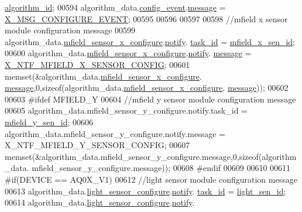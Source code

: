 \begin{DoxyCode}
{{{{{      \hyperlink{a00038_aff3e3d622fcd96787628167d3c1856f9}{algorithm\_id};
00594     algorithm\_data.\hyperlink{a00016_a461881ff0583945fd26ee6d5faf8ce1b}{config\_event}.\hyperlink{a00036_adf9665938515a20c283eea2c978cf80d}{message}                      = 
      \hyperlink{a00016_a410c7d83b819fa283303a53830c87a96}{X\_MSG\_CONFIGURE\_EVENT};
00595 
00596    
00597 
00598     \textcolor{comment}{//mfield x sensor module configuration message}
00599     algorithm\_data.\hyperlink{a00016_a1bfdf4869db9c4f125b763d2e27c6c08}{mfield\_sensor\_x\_configure}.\hyperlink{a00019_a8e6a04c2283f9fd7b8dcbc62faba5847}{notify}.
      \hyperlink{a00036_a21b41e494a28583d4da10f1afb1c5328}{task\_id}  = \hyperlink{a00019_a19a33e680bf19d1aed76750132ed8b64}{mfield\_x\_sen\_id};
00600     algorithm\_data.\hyperlink{a00016_a1bfdf4869db9c4f125b763d2e27c6c08}{mfield\_sensor\_x\_configure}.\hyperlink{a00019_a8e6a04c2283f9fd7b8dcbc62faba5847}{notify}.
      \hyperlink{a00036_adf9665938515a20c283eea2c978cf80d}{message}  = \hyperlink{a00019_aa16cf9dd51c7cbef48581b7862153ced}{X\_NTF\_MFIELD\_X\_SENSOR\_CONFIG};
00601     memset(&algorithm\_data.\hyperlink{a00016_a1bfdf4869db9c4f125b763d2e27c6c08}{mfield\_sensor\_x\_configure}.
      \hyperlink{a00019_ae926905663cb8ca01f1bc2d670e428f5}{message},0,\textcolor{keyword}{sizeof}(algorithm\_data.\hyperlink{a00016_a1bfdf4869db9c4f125b763d2e27c6c08}{mfield\_sensor\_x\_configure}.
      \hyperlink{a00019_ae926905663cb8ca01f1bc2d670e428f5}{message}));
00602 
00603 \textcolor{preprocessor}{#ifdef MFIELD\_Y}
00604     \textcolor{comment}{//mfield y sensor module configuration message}
00605     algorithm\_data.mfield\_sensor\_y\_configure.notify.task\_id  = \hyperlink{a00019_a99c4ad3cf8b9ce2b67351d6edf48f937}{mfield\_y\_sen\_id};
00606     algorithm\_data.mfield\_sensor\_y\_configure.notify.message  = X\_NTF\_MFIELD\_Y\_SENSOR\_CONFIG;
00607     memset(&algorithm\_data.mfield\_sensor\_y\_configure.message,0,\textcolor{keyword}{sizeof}(algorithm\_data.
      mfield\_sensor\_y\_configure.message));
00608 \textcolor{preprocessor}{#endif}
00609 
00610 
00611 \textcolor{preprocessor}{#if(DEVICE == AQ0X\_V1)}
00612     \textcolor{comment}{//light sensor module configuration message}
00613     algorithm\_data.\hyperlink{a00016_a8fc7528336e37724802eb52753c7b7a6}{light\_sensor\_configure}.\hyperlink{a00018_a8e6a04c2283f9fd7b8dcbc62faba5847}{notify}.
      \hyperlink{a00036_a21b41e494a28583d4da10f1afb1c5328}{task\_id}     = \hyperlink{a00018_a757e7771170ace1d9f8519bd318ec64a}{light\_sen\_id};
00614     algorithm\_data.\hyperlink{a00016_a8fc7528336e37724802eb52753c7b7a6}{light\_sensor\_configure}.\hyperlink{a00018_a8e6a04c2283f9fd7b8dcbc62faba5847}{notify}.
}}}}}
\end{DoxyCode}
